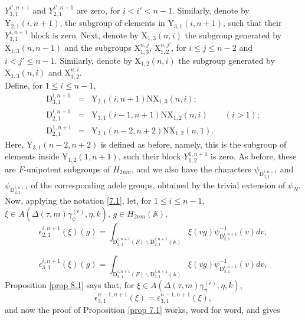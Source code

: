 \documentclass[12pts]{amsart}
\newcommand{\BA}{{\mathbb {A}}}
\begin{document}
$Y_{3,1}^{i',n+1}$ and $Y_{2,1}^{i',n+1}$ are zero, for $i<i'<n-1$.
Similarly, denote by $\mathrm{Y}_{2,1}(i,n+1)$, the subgroup of
elements in $\mathrm{Y}_{3,1}(i,n+1)$, such that their
$Y_{3,1}^{i,n+1}$ block is zero. Next, denote by
$\mathrm{X}_{1,3}(n,i)$ the subgroup generated by
$\mathrm{X}_{1,3}(n,n-1)$ and the subgroups
$\mathrm{X}_{1,3}^{n,j}$, $\mathrm{X}_{1,2}^{n,j'}$, for $i\leq
j\leq n-2$ and $i<j'\leq n-1$. Similarly, denote by
$\mathrm{X}_{1,2}(n,i)$ the subgroup generated by
$\mathrm{X}_{1,3}(n,i)$ and $\mathrm{X}_{1,2}^{n,i}$.\\
Define, for $1\leq i\leq n-1$,
\begin{equation}\label{8.14}
\begin{array}{rcl}
\mathrm{D}_{3,1}^{i,n+1}&=&\mathrm{Y}_{2,1}(i,n+1)\mathrm{N}\mathrm{X}_{1,3}(n,i);\\
\mathrm{D}_{2,1}^{i,n+1}&=&\mathrm{Y}_{3,1}(i-1,n+1)\mathrm{N}\mathrm{X}_{1,2}(n,i)\qquad
(i>1);\\
\mathrm{D}_{2,1}^{1,n+1}&=&\mathrm{Y}_{3,1}(n-2,n+2)\mathrm{N}\mathrm{X}_{1,2}(n,1).
\end{array}
\end{equation}
Here, $\mathrm{Y}_{3,1}(n-2,n+2)$ is defined as before, namely, this
is the subgroup of elements inside $\mathrm{Y}_{1,2}(1,n+1)$, such
their block $Y_{1,2}^{1,n+1}$ is zero. As before, these are
$F$-unipotent subgroups of $H_{2nm}$, and we also have the
characters $\psi_{\mathrm{D}_{3,1}^{i,n+1}}$ and
$\psi_{\mathrm{D}_{2,1}^{i,n+1}}$ of the corresponding adele groups,
obtained by the trivial extension of $\psi_N$. Now, applying the notation
\eqref{7.1}, let, for $1\leq i\leq n-1$, $\xi \in A(\Delta(\tau,m)\gamma_\psi^{(\epsilon)},\eta,k)$,
$g\in H_{2nm}(\BA)$,
\begin{equation}\label{8.15}
\epsilon_{2,1}^{i,n+1}(\xi)(g)=\int_{\mathrm{D}_{2,1}^{i,n+1}(F)\backslash
	\mathrm{D}_{2,1}^{i,n+1}(\BA)}\xi(vg)\psi_{\mathrm{D}_{2,1}^{i,n+1}}^{-1}(v)dv,
\end{equation}

$$
\epsilon_{3,1}^{i,n+1}(\xi)(g)=\int_{\mathrm{D}_{3,1}^{i,n+1}(F)\backslash
	\mathrm{D}_{3,1}^{i,n+1}(\BA)}\xi(vg)\psi_{\mathrm{D}_{3,1}^{i,n+1}}^{-1}(v)dv,
$$
Proposition \ref{prop 8.1} says that, for $\xi\in A(\Delta(\tau,m)\gamma_\pi^{(\epsilon)},\eta,k)$,
$$
\epsilon_{3,1}^{n-1,n+1}(\xi)=\varepsilon_{3,1}^{n-1,n+1}(\xi),
$$
and now the proof of Proposition \ref{prop 7.1} works, word for word,
and gives
\end{document}
